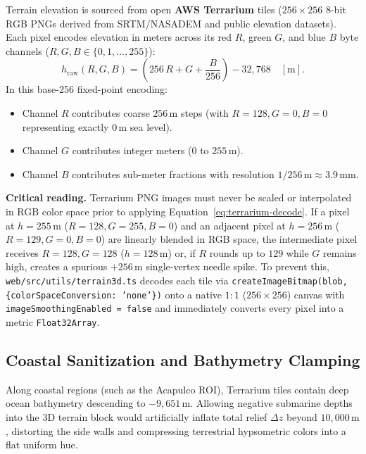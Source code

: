 \documentclass[11pt,a4paper]{article}
\newcommand{\src}[1]{\nolinkurl{#1}}
\newcommand{\unit}[1]{\mathrm{#1}}
\newcommand{\warn}[1]{\par\noindent\colorbox{blue!8}{\parbox{.965\linewidth}{\textbf{Critical reading.} #1}}\par}
\begin{document}
Terrain elevation is sourced from open \textbf{AWS Terrarium} tiles ($256\times256$ 8-bit RGB PNGs derived from SRTM/NASADEM and public elevation datasets). Each pixel encodes elevation in meters across its red $R$, green $G$, and blue $B$ byte channels ($R,G,B\in\{0,1,\ldots,255\}$):
\begin{equation}
  h_{\mathrm{raw}}(R,G,B) = \left(256\,R + G + \frac{B}{256}\right) - 32,768\quad[\unit{m}].
  \label{eq:terrarium-decode}
\end{equation}
In this base-256 fixed-point encoding:
\begin{itemize}
  \item Channel $R$ contributes coarse $256\,\unit{m}$ steps (with $R=128, G=0, B=0$ representing exactly $0\,\unit{m}$ sea level).
  \item Channel $G$ contributes integer meters ($0$ to $255\,\unit{m}$).
  \item Channel $B$ contributes sub-meter fractions with resolution $1/256\,\unit{m}\approx 3.9\,\unit{mm}$.
\end{itemize}

\warn{Terrarium PNG images must never be scaled or interpolated in RGB color space prior to applying Equation~\eqref{eq:terrarium-decode}. If a pixel at $h=255\,\unit{m}$ ($R=128,G=255,B=0$) and an adjacent pixel at $h=256\,\unit{m}$ ($R=129,G=0,B=0$) are linearly blended in RGB space, the intermediate pixel receives $R=128,G=128$ ($h=128\,\unit{m}$) or, if $R$ rounds up to $129$ while $G$ remains high, creates a spurious $+256\,\unit{m}$ single-vertex needle spike. To prevent this, \src{web/src/utils/terrain3d.ts} decodes each tile via \texttt{createImageBitmap(blob, \{colorSpaceConversion: 'none'\})} onto a native $1:1$ ($256\times256$) canvas with \texttt{imageSmoothingEnabled = false} and immediately converts every pixel into a metric \texttt{Float32Array}.}

\subsection{Coastal Sanitization and Bathymetry Clamping}
\label{sec:relieve3d-saneamiento}

Along coastal regions (such as the Acapulco ROI), Terrarium tiles contain deep ocean bathymetry descending to $-9,651\,\unit{m}$. Allowing negative submarine depths into the 3D terrain block would artificially inflate total relief $\Delta z$ beyond $10,000\,\unit{m}$, distorting the side walls and compressing terrestrial hypsometric colors into a flat uniform hue.
\end{document}

